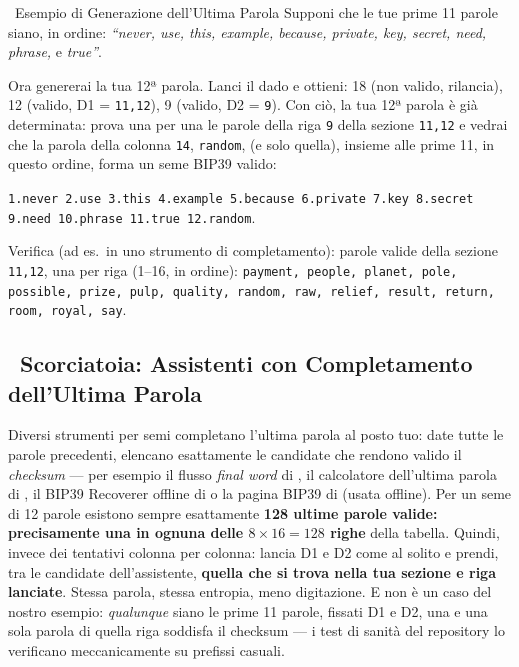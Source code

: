\documentclass[10pt]{article}
\begin{document}
\begin{examplebox}{\faLightbulb~Esempio di Generazione dell'Ultima Parola}
Supponi che le tue prime 11 parole siano, in ordine: \textit{``never, use, this, example, because, private, key, secret, need, phrase,} e \textit{true''}.

Ora genererai la tua 12ª parola. Lanci il dado e ottieni: 18 (non valido, rilancia), 12 (valido, D1 = \texttt{11,12}), 9 (valido, D2 = \texttt{9}). Con ciò, la tua 12ª parola è già determinata: prova una per una le parole della riga \texttt{9} della sezione \texttt{11,12} e vedrai che la parola della colonna \texttt{14}, \texttt{random}, (e solo quella), insieme alle prime 11, in questo ordine, forma un seme BIP39 valido:

\vspace{0.5em}
\texttt{1.never 2.use 3.this 4.example 5.because 6.private 7.key 8.secret 9.need 10.phrase 11.true 12.random}. \faCheckCircle
\vspace{0.25em}

{\scriptsize Verifica (ad es.\ in uno strumento di completamento): parole valide della sezione \texttt{11,12}, una per riga (1--16, in ordine): \texttt{payment, people, planet, pole, possible, prize, pulp, quality, random, raw, relief, result, return, room, royal, say}.\par}
\end{examplebox}

\subsection*{\faMagic~Scorciatoia: Assistenti con Completamento dell'Ultima Parola}

Diversi strumenti per semi completano l'ultima parola al posto tuo: date tutte le parole precedenti, elencano esattamente le candidate che rendono valido il \textit{checksum} --- per esempio il flusso \textit{final word} di \seedsignerlink{}, il calcolatore dell'ultima parola di \seedpickerlink{}, il BIP39 Recoverer offline di \coinplatelink{} o la pagina BIP39 di \iancolemanlink{} (usata offline). Per un seme di 12 parole esistono sempre esattamente \textbf{128 ultime parole valide: precisamente una in ognuna delle $8\times16=128$ righe} della tabella. Quindi, invece dei tentativi colonna per colonna: lancia D1 e D2 come al solito e prendi, tra le candidate dell'assistente, \textbf{quella che si trova nella tua sezione e riga lanciate}. Stessa parola, stessa entropia, meno digitazione. E non è un caso del nostro esempio: \emph{qualunque} siano le prime 11 parole, fissati D1 e D2, una e una sola parola di quella riga soddisfa il checksum --- i test di sanità del repository lo verificano meccanicamente su prefissi casuali.
\end{document}
